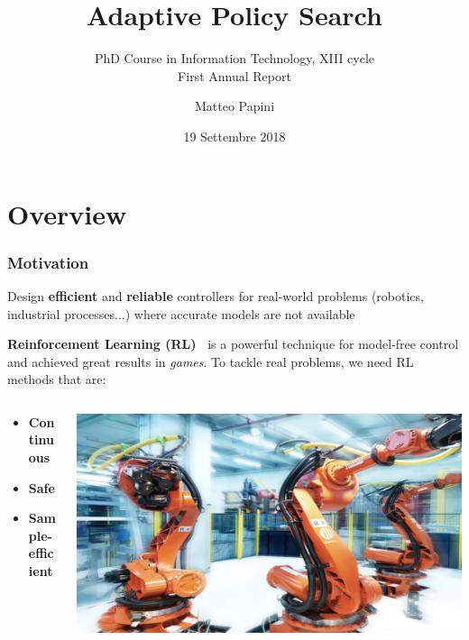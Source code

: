 \documentclass{beamer}
\title[Adaptive Policy Search]{Adaptive Policy Search}
\subtitle{PhD Course in Information Technology, XIII cycle \\First Annual Report}
\author[M. Papini]{Matteo Papini}
\date[19/9/2018]{\small 19 Settembre 2018}
\begin{document}

\begin{frame}
\titlepage
\end{frame}

\addtocounter{framenumber}{-1}



\section{Overview}

\begin{frame}
\frametitle{Motivation}
Design \textbf{efficient} and \textbf{reliable} controllers for real-world problems (robotics, industrial processes...) where accurate models are not available

\vfill

\textbf{Reinforcement Learning (RL)~\cite{sutton1998reinforcement}} is a powerful technique for model-free control and achieved great results in \textit{games}. To tackle real problems, we need RL methods that are:

\vfill

\begin{columns}
	\begin{column}{.6\textwidth}
		\begin{itemize}
			\item \textbf{Continuous}
			\item \textbf{Safe}
			\item \textbf{Sample-efficient}
		\end{itemize}
	\end{column}
	\begin{column}{.4\textwidth}
		\includegraphics[width=\textwidth]{pics/robots.jpg}
	\end{column}
\end{columns}


\end{frame}
\end{document}
